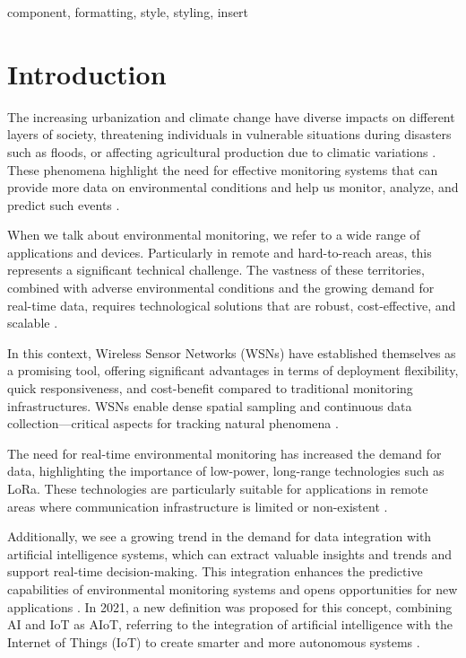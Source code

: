 \documentclass[conference]{IEEEtran}
\begin{document}
\begin{IEEEkeywords}
component, formatting, style, styling, insert
\end{IEEEkeywords}

\section{Introduction}
The increasing urbanization and climate change have diverse impacts on different layers of society, threatening individuals in vulnerable situations during disasters such as floods, or affecting agricultural production due to climatic variations \cite{jonkman_2005_global, hall_2014_understanding, bragana_2024_anlise, borga_2014_hydrogeomorphic}. These phenomena highlight the need for effective monitoring systems that can provide more data on environmental conditions and help us monitor, analyze, and predict such events \cite{hall_2014_understanding, lin_2020_semantic, lo_2015_visual, iqbal_2021_how}.

When we talk about environmental monitoring, we refer to a wide range of applications and devices. Particularly in remote and hard-to-reach areas, this represents a significant technical challenge. The vastness of these territories, combined with adverse environmental conditions and the growing demand for real-time data, requires technological solutions that are robust, cost-effective, and scalable \cite{chen_2013_natural, yellampalli_2021_wireless, pule_2017_wireless}.

In this context, Wireless Sensor Networks (WSNs) have established themselves as a promising tool, offering significant advantages in terms of deployment flexibility, quick responsiveness, and cost-benefit compared to traditional monitoring infrastructures. WSNs enable dense spatial sampling and continuous data collection—critical aspects for tracking natural phenomena \cite{chen_2013_natural, ferreira_2023_conception, pule_2017_wireless}.

The need for real-time environmental monitoring has increased the demand for data, highlighting the importance of low-power, long-range technologies such as LoRa. These technologies are particularly suitable for applications in remote areas where communication infrastructure is limited or non-existent \cite{pule_2017_wireless, chen_2013_natural, ferreira_2023_conception}.

Additionally, we see a growing trend in the demand for data integration with artificial intelligence systems, which can extract valuable insights and trends and support real-time decision-making. This integration enhances the predictive capabilities of environmental monitoring systems and opens opportunities for new applications \cite{nr_2025_ai, mukhopadhyay_2021_artificial, ferreira_2023_conception, chen_2013_natural, lin_2020_semantic}. In 2021, a new definition was proposed for this concept, combining AI and IoT as AIoT, referring to the integration of artificial intelligence with the Internet of Things (IoT) to create smarter and more autonomous systems \cite{mukhopadhyay_2021_artificial}.
\end{document}

